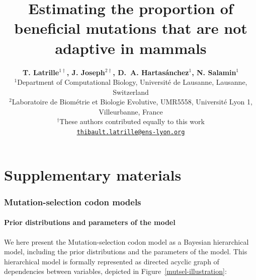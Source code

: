 \documentclass{article}
\title{\textbf{Estimating the proportion of beneficial mutations that are not adaptive in mammals}}
\author{
    \large
    \textbf{T. {Latrille}$^{1\dag}$\orcidlink{0000-0002-9643-4668}, J. {Joseph}$^{2\dag}$\orcidlink{0009-0002-1312-9930}, D.~A. {Hartasánchez}$^{1}$\orcidlink{0000-0003-2596-6883}, N. {Salamin}$^{1}$\orcidlink{0000-0002-3963-4954}}\\
    \scriptsize $^{1}$Department of Computational Biology, Université de Lausanne, Lausanne, Switzerland\\
    \scriptsize $^{2}$Laboratoire de Biométrie et Biologie Evolutive, UMR5558, Université Lyon 1, Villeurbanne, France \\
    \scriptsize $^{\dag}$These authors contributed equally to this work\\
    \normalsize \texttt{\href{mailto:thibault.latrille@ens-lyon.org}{thibault.latrille@ens-lyon.org}} \\
}
\date{}
\begin{document}
    \maketitle
    \part*{Supplementary materials}
    \tableofcontents

    \newpage
    \listoffigures

    \newpage
    \listoftables

    \clearpage
    \section{Mutation-selection codon models}\label{sec:mutsel}

    \subsection{Prior distributions and parameters of the model}\label{subsec:priors}

    We here present the Mutation-selection codon model as a Bayesian hierarchical model, including the prior distributions and the parameters of the model.
    This hierarchical model is formally represented as directed acyclic graph of dependencies between variables, depicted in Figure~\ref{mutsel-illustration}:
\end{document}
